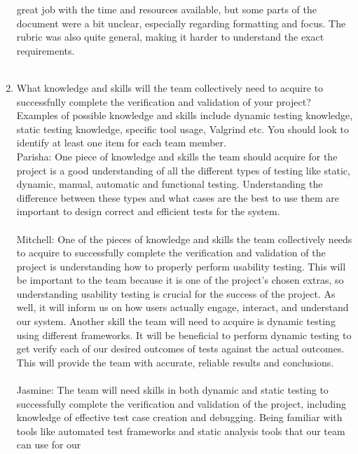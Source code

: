 \documentclass[12pt, titlepage]{article}
\begin{document}
\begin{enumerate}
  great job with the time and resources available, but some parts of the document were a 
  bit unclear, especially regarding formatting and focus. The rubric was also quite 
  general, making it harder to understand the exact requirements.\\\\
  \item What knowledge and skills will the team collectively need to acquire to
  successfully complete the verification and validation of your project?
  Examples of possible knowledge and skills include dynamic testing knowledge,
  static testing knowledge, specific tool usage, Valgrind etc.  You should look to
  identify at least one item for each team member.\\
  \newline
  \hspace{2em} Parisha: One piece of knowledge and skills the team should acquire for the project is a good understanding 
  of all the different types of testing like static, dynamic, manual, automatic and functional testing. Understanding the difference
  between these types and what cases are the best to use them are important to design correct and efficient tests for the system.\\\\
  \hspace{2em} Mitchell: One of the pieces of knowledge and skills the team collectively needs to acquire to 
  successfully complete the verification and validation of the project is understanding how to properly perform
  usability testing. This will be important to the team because it is one of the project's chosen extras, so understanding
  usability testing is crucial for the success of the project. As well, it will inform us on how users actually engage,
  interact, and understand our system. Another skill the team will need to acquire is dynamic testing using different frameworks.
  It will be beneficial to perform dynamic testing to get verify each of our desired outcomes of tests against the actual outcomes.
  This will provide the team with accurate, reliable results and conclusions.\\\\
  \hspace{2em} Jasmine: The team will need skills in both dynamic and static testing to successfully complete the 
  verification and validation of the project, including knowledge of effective test case creation and debugging. 
  Being familiar with tools like automated test frameworks and static analysis tools that our team can use for our 

\end{enumerate}
\end{document}

